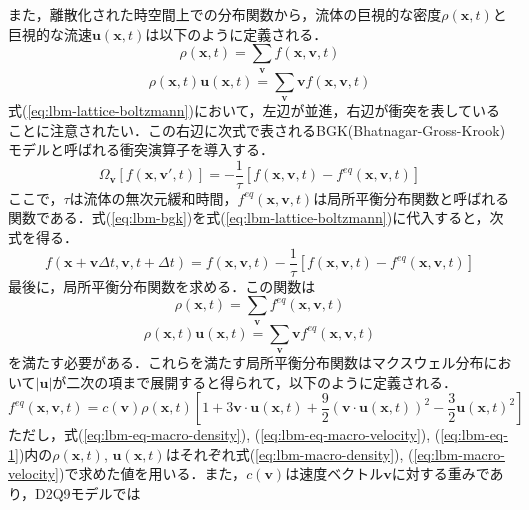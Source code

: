 また，離散化された時空間上での分布関数から，流体の巨視的な密度$\rho(\bm{x}, t)$と巨視的な流速$\bm{u}(\bm{x}, t)$は以下のように定義される．
\begin{equation}
  \rho(\bm{x}, t) = \sum_{\bm{v}} f(\bm{x}, \bm{v}, t)
  \label{eq:lbm-macro-density}
\end{equation}
\begin{equation}
  \rho(\bm{x}, t) \bm{u}(\bm{x}, t) = \sum_{\bm{v}} \bm{v} f(\bm{x}, \bm{v}, t)
  \label{eq:lbm-macro-velocity}
\end{equation}
式(\ref{eq:lbm-lattice-boltzmann})において，左辺が並進，右辺が衝突を表していることに注意されたい．この右辺に次式で表されるBGK(Bhatnagar-Gross-Krook)モデルと呼ばれる衝突演算子\cite{PhysRev.94.511}を導入する．
\begin{equation}
  \Omega_{\bm{v}}\left[ f(\bm{x}, \bm{v}', t) \right] = -\frac{1}{\tau} \left[ f(\bm{x}, \bm{v}, t) - f^{eq}(\bm{x}, \bm{v}, t) \right]
  \label{eq:lbm-bgk}
\end{equation}
ここで，$\tau$は流体の無次元緩和時間，$f^{eq}(\bm{x}, \bm{v}, t)$は局所平衡分布関数と呼ばれる関数である．式(\ref{eq:lbm-bgk})を式(\ref{eq:lbm-lattice-boltzmann})に代入すると，次式を得る．
\begin{equation}
  f(\bm{x}+\bm{v}\Delta t, \bm{v}, t+\Delta t) = f(\bm{x}, \bm{v}, t) - \frac{1}{\tau} \left[ f(\bm{x}, \bm{v}, t) - f^{eq}(\bm{x}, \bm{v}, t) \right]
  \label{eq:lbm-bgk-lattice-boltzmann}
\end{equation}
最後に，局所平衡分布関数を求める．この関数は
\begin{equation}
  \rho(\bm{x}, t) = \sum_{\bm{v}} f^{eq}(\bm{x}, \bm{v}, t)
  \label{eq:lbm-eq-macro-density}
\end{equation}
\begin{equation}
  \rho(\bm{x}, t) \bm{u}(\bm{x}, t) = \sum_{\bm{v}} \bm{v} f^{eq}(\bm{x}, \bm{v}, t)
  \label{eq:lbm-eq-macro-velocity}
\end{equation}
を満たす必要がある．これらを満たす局所平衡分布関数はマクスウェル分布\cite{Asakura1989}において$|\bm{u}|$が二次の項まで展開すると得られて，以下のように定義される．
\begin{equation}
  f^{eq}(\bm{x}, \bm{v}, t) = c(\bm{v}) \rho(\bm{x}, t) \left[ 1 + 3\bm{v} \cdot \bm{u}(\bm{x}, t) + \frac{9}{2}(\bm{v} \cdot \bm{u}(\bm{x}, t))^2 - \frac{3}{2}\bm{u}(\bm{x}, t)^2 \right]
  \label{eq:lbm-eq-1}
\end{equation}
ただし，式(\ref{eq:lbm-eq-macro-density}), (\ref{eq:lbm-eq-macro-velocity}), (\ref{eq:lbm-eq-1})内の$\rho(\bm{x}, t)$, $\bm{u}(\bm{x}, t)$はそれぞれ式(\ref{eq:lbm-macro-density}), (\ref{eq:lbm-macro-velocity})で求めた値を用いる．また，$c(\bm{v})$は速度ベクトル$\bm{v}$に対する重みであり，D2Q9モデルでは
